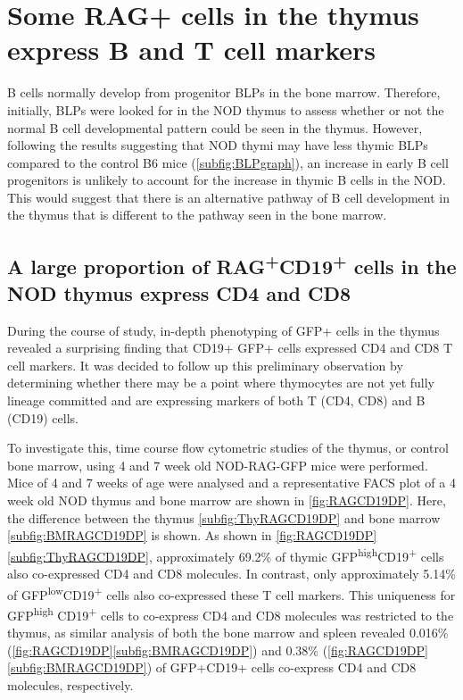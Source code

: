 \section{Some RAG+ cells in the thymus express B and T cell markers}

B cells normally develop from progenitor BLPs in the bone marrow.
Therefore, initially, BLPs were looked for in the NOD thymus to assess whether or not the normal B cell developmental pattern could be seen in the thymus.
However, following the results suggesting that NOD thymi may have less thymic BLPs compared to the control B6 mice (\cref{subfig:BLPgraph}), an increase in early B cell progenitors is unlikely to account for the increase in thymic B cells in the NOD.
This would suggest that there is an alternative pathway of B cell development in the thymus that is different to the pathway seen in the bone marrow.

\subsection{A large proportion of RAG\textsuperscript{+}CD19\textsuperscript{+} cells in the NOD thymus express CD4 and CD8}

During the course of study, in-depth phenotyping of GFP+ cells in the thymus revealed a surprising finding that CD19+ GFP+ cells expressed CD4 and CD8 T cell markers.
It was decided to follow up this preliminary observation by determining whether there may be a point where thymocytes are not yet fully lineage committed and are expressing markers of both T (CD4, CD8) and B (CD19) cells.

To investigate this, time course flow cytometric studies of the thymus, or control bone marrow, using 4 and 7 week old NOD-RAG-GFP mice were performed.
Mice of 4 and 7 weeks of age were analysed and a representative FACS plot of a 4 week old NOD thymus and bone marrow are shown in \cref{fig:RAGCD19DP}. 
Here, the difference between the thymus \cref{subfig:ThyRAGCD19DP} and bone marrow \cref{subfig:BMRAGCD19DP} is shown.
As shown in \cref{fig:RAGCD19DP}\ref{subfig:ThyRAGCD19DP}, approximately 69.2\% of thymic GFP\textsuperscript{high}CD19\textsuperscript{+} cells also co-expressed CD4 and CD8 molecules.
In contrast, only approximately 5.14\% of GFP\textsuperscript{low}CD19\textsuperscript{+} cells also co-expressed these T cell markers.
This uniqueness for GFP\textsuperscript{high} CD19\textsuperscript{+} cells to co-express CD4 and CD8 molecules was restricted to the thymus, as similar analysis of both the bone marrow and spleen revealed 0.016\% (\cref{fig:RAGCD19DP}\ref{subfig:BMRAGCD19DP}) and 0.38\% (\cref{fig:RAGCD19DP}\ref{subfig:BMRAGCD19DP}) of GFP+CD19+ cells co-express CD4 and CD8 molecules, respectively.


